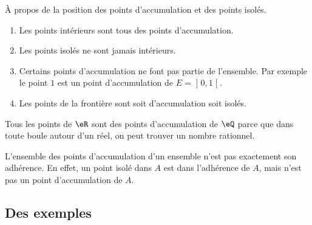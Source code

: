 \begin{remark}
	À propos de la position des points d'accumulation et des points isolés.
	\begin{enumerate}
		\item
		      Les points intérieurs sont tous des points d'accumulation.
		\item
		      Les points isolés ne sont jamais intérieurs.
		\item
		      Certains points d'accumulation ne font pas partie de l'ensemble. Par exemple le point $1$ est un point d'accumulation de $E=\mathopen] 0 , 1 \mathclose[$.
		\item
		      Les points de la frontière sont soit d'accumulation soit isolés.
	\end{enumerate}
\end{remark}

\begin{example}
	Tous les points de $\eR$ sont des points d'accumulation de $\eQ$ parce que dans toute boule autour d'un réel, on peut trouver un nombre rationnel.
\end{example}

\begin{remark}
	L'ensemble des points d'accumulation d'un ensemble n'est pas exactement son adhérence. En effet, un point isolé dans $A$ est dans l'adhérence de $A$, mais n'est pas un point d'accumulation de $A$.
\end{remark}

\subsection{Des exemples}


